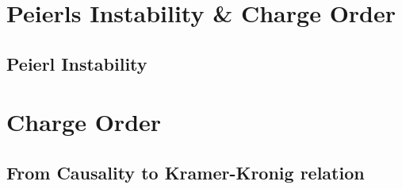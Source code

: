 \documentclass[10pt]{report}
\numberwithin{equation}{chapter}
\begin{document}
%


\chapter{Peierls Instability \& Charge Order}

\section{Peierl Instability}


%

\chapter{Charge Order}

\section{From Causality to Kramer-Kronig relation}
\end{document}
